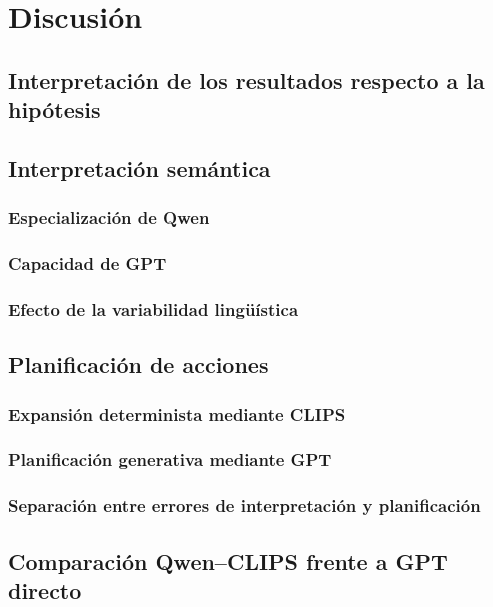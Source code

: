 \chapter{Discusión}

\section{Interpretación de los resultados respecto a la hipótesis}


\section{Interpretación semántica}

\subsection{Especialización de Qwen}

\subsection{Capacidad de GPT}

\subsection{Efecto de la variabilidad lingüística}


\section{Planificación de acciones}

\subsection{Expansión determinista mediante CLIPS}

\subsection{Planificación generativa mediante GPT}

\subsection{Separación entre errores de interpretación y planificación}


\section{Comparación Qwen--CLIPS frente a GPT directo}


